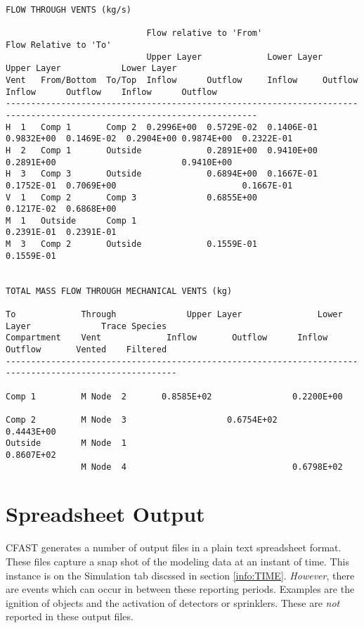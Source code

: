 \begin{lstlisting}[basicstyle=\tiny]
FLOW THROUGH VENTS (kg/s)

                            Flow relative to 'From'                        Flow Relative to 'To'
                            Upper Layer             Lower Layer            Upper Layer            Lower Layer
Vent   From/Bottom  To/Top  Inflow      Outflow     Inflow     Outflow     Inflow      Outflow    Inflow      Outflow
------------------------------------------------------------------------------------------------------------------------
H  1   Comp 1       Comp 2  0.2996E+00  0.5729E-02  0.1406E-01 0.9832E+00  0.1469E-02  0.2904E+00 0.9874E+00  0.2322E-01
H  2   Comp 1       Outside             0.2891E+00  0.9410E+00             0.2891E+00                         0.9410E+00
H  3   Comp 3       Outside             0.6894E+00  0.1667E-01 0.1752E-01  0.7069E+00                         0.1667E-01
V  1   Comp 2       Comp 3              0.6855E+00             0.1217E-02  0.6868E+00
M  1   Outside      Comp 1                                     0.2391E-01  0.2391E-01
M  3   Comp 2       Outside             0.1559E-01                                                0.1559E-01


TOTAL MASS FLOW THROUGH MECHANICAL VENTS (kg)

To             Through              Upper Layer               Lower Layer              Trace Species
Compartment    Vent             Inflow       Outflow      Inflow       Outflow       Vented    Filtered
--------------------------------------------------------------------------------------------------------

Comp 1         M Node  2       0.8585E+02                0.2200E+00

Comp 2         M Node  3                    0.6754E+02                0.4443E+00
Outside        M Node  1                                              0.8607E+02
               M Node  4                                 0.6798E+02
\end{lstlisting}


\section{Spreadsheet Output}

CFAST generates a number of output files in a plain text spreadsheet format.  These files capture a snap shot of the modeling data at an instant of time. This instance is on the Simulation tab discssed in section \ref{info:TIME}. \emph{However}, there are events which can occur in between these reporting periods. Examples are the ignition of objects and the activation of detectors or sprinklers. These are \emph{not} reported in these output files.

